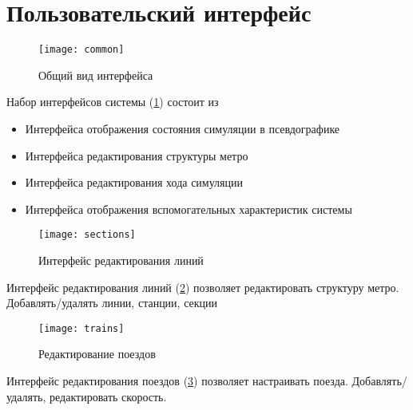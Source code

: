 \section{Пользовательский интерфейс}

\begin{figure}[h]
    \centering

    \texttt{[image: common]}
    \caption{Общий вид интерфейса}
    \label{fig:common}
\end{figure}

Набор интерфейсов системы (\ref{fig:common}) состоит из
\begin{itemize}
    \item Интерфейса отображения состояния симуляции в псевдографике
    \item Интерфейса редактирования структуры метро
    \item Интерфейса редактирования хода симуляции
    \item Интерфейса отображения вспомогательных характеристик системы
\end{itemize}

\pagebreak

\begin{figure}[h]
    \centering
    \texttt{[image: sections]}
    \caption{Интерфейс редактирования линий}
    \label{fig:sections}
\end{figure}

Интерфейс редактирования линий (\ref{fig:sections}) позволяет редактировать структуру метро.
Добавлять/удалять линии, станции, секции

\pagebreak

\begin{figure}[]
    \centering
    \texttt{[image: trains]}
    \caption{Редактирование поездов}
    \label{fig:trains}
\end{figure}

Интерфейс редактирования поездов (\ref{fig:trains}) позволяет настраивать поезда.
Добавлять/удалять, редактировать скорость.
